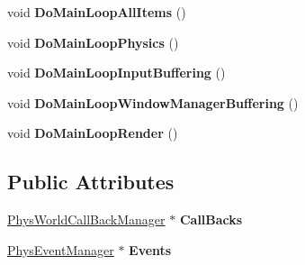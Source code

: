 \begin{DoxyCompactItemize}
\item 
\hypertarget{classPhysWorld_a60b7978b39fc347c2f37077737783da6}{
void {\bfseries DoMainLoopAllItems} ()}
\label{db/df5/classPhysWorld_a60b7978b39fc347c2f37077737783da6}

\item 
\hypertarget{classPhysWorld_a994d7d8c4a9a0c003c3e7d89be7b399b}{
void {\bfseries DoMainLoopPhysics} ()}
\label{db/df5/classPhysWorld_a994d7d8c4a9a0c003c3e7d89be7b399b}

\item 
\hypertarget{classPhysWorld_a81b3f0dcc0a90d039623f696343e6e9c}{
void {\bfseries DoMainLoopInputBuffering} ()}
\label{db/df5/classPhysWorld_a81b3f0dcc0a90d039623f696343e6e9c}

\item 
\hypertarget{classPhysWorld_ae81bab7f314d98f7b787c508e60c9c9a}{
void {\bfseries DoMainLoopWindowManagerBuffering} ()}
\label{db/df5/classPhysWorld_ae81bab7f314d98f7b787c508e60c9c9a}

\item 
\hypertarget{classPhysWorld_a8f33541d67164a2452e568443e9905be}{
void {\bfseries DoMainLoopRender} ()}
\label{db/df5/classPhysWorld_a8f33541d67164a2452e568443e9905be}

\end{DoxyCompactItemize}
\subsection*{Public Attributes}
\begin{DoxyCompactItemize}
\item 
\hypertarget{classPhysWorld_a080ea6f1584374b07d3c1f29c7ed64df}{
\hyperlink{classPhysWorldCallBackManager}{PhysWorldCallBackManager} $\ast$ {\bfseries CallBacks}}
\label{db/df5/classPhysWorld_a080ea6f1584374b07d3c1f29c7ed64df}

\item 
\hypertarget{classPhysWorld_a601b3c6093aaf2a69fcd3311dde9aadc}{
\hyperlink{classPhysEventManager}{PhysEventManager} $\ast$ {\bfseries Events}}
\label{db/df5/classPhysWorld_a601b3c6093aaf2a69fcd3311dde9aadc}

\end{DoxyCompactItemize}
